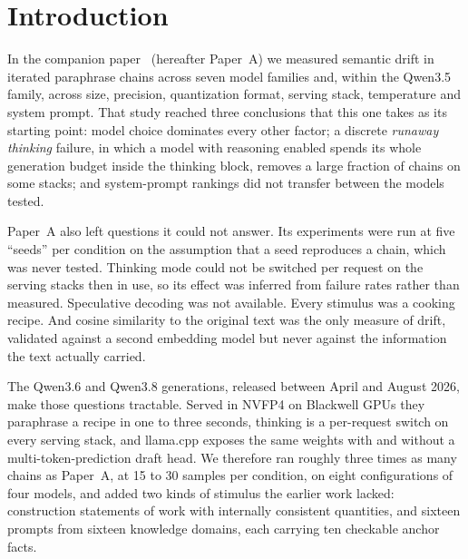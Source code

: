 \documentclass[11pt]{article}
\begin{document}
\section{Introduction}
\label{sec:intro}

In the companion paper~\citep{smith2026drift} (hereafter Paper~A) we
measured semantic drift in iterated paraphrase chains across seven model
families and, within the Qwen3.5 family, across size, precision,
quantization format, serving stack, temperature and system prompt. That
study reached three conclusions that this one takes as its starting point:
model choice dominates every other factor; a discrete \emph{runaway
thinking} failure, in which a model with reasoning enabled spends its whole
generation budget inside the thinking block, removes a large fraction of
chains on some stacks; and system-prompt rankings did not transfer between
the models tested.

Paper~A also left questions it could not answer. Its experiments were run at
five ``seeds'' per condition on the assumption that a seed reproduces a
chain, which was never tested. Thinking mode could not be switched per
request on the serving stacks then in use, so its effect was inferred from
failure rates rather than measured. Speculative decoding was not available.
Every stimulus was a cooking recipe. And cosine similarity to the original
text was the only measure of drift, validated against a second embedding
model but never against the information the text actually carried.

The Qwen3.6 and Qwen3.8 generations, released between April and August
2026, make those questions tractable. Served in NVFP4 on Blackwell GPUs
they paraphrase a recipe in one to three seconds, thinking is a per-request
switch on every serving stack, and llama.cpp exposes the same weights with
and without a multi-token-prediction draft head. We therefore ran roughly
three times as many chains as Paper~A, at 15 to 30 samples per condition,
on eight configurations of four models, and added two kinds of stimulus the
earlier work lacked: construction statements of work with internally
consistent quantities, and sixteen prompts from sixteen knowledge domains,
each carrying ten checkable anchor facts.
\end{document}
